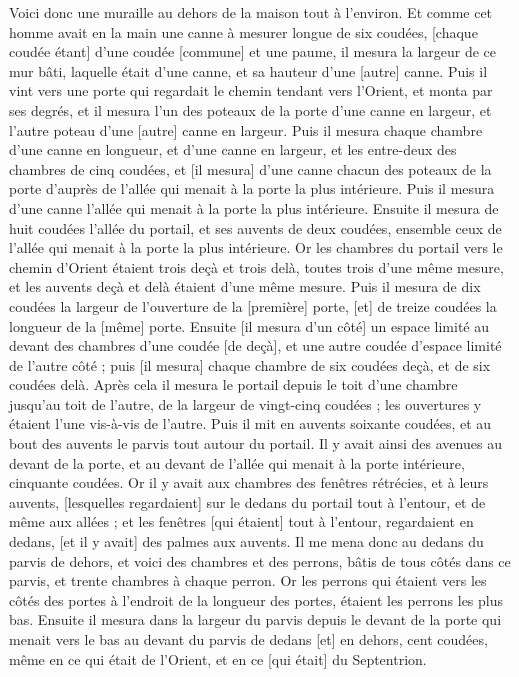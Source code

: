 \begin{multicols}{2}
Voici donc une muraille au dehors de la maison tout à l'environ. Et comme cet homme avait en la main une canne à mesurer longue de six coudées, [chaque coudée étant] d'une coudée [commune] et une paume, il mesura la largeur de ce mur bâti, laquelle était d'une canne, et sa hauteur d'une [autre] canne.
Puis il vint vers une porte qui regardait le chemin tendant vers l'Orient, et monta par ses degrés, et il mesura l'un des poteaux de la porte d'une canne en largeur, et l'autre poteau d'une [autre] canne en largeur.
Puis il mesura chaque chambre d'une canne en longueur, et d'une canne en largeur, et les entre-deux des chambres de cinq coudées, et [il mesura] d'une canne chacun des poteaux de la porte d'auprès de l'allée qui menait à la porte la plus intérieure.
Puis il mesura d'une canne l'allée qui menait à la porte la plus intérieure.
Ensuite il mesura de huit coudées l'allée du portail, et ses auvents de deux coudées, ensemble ceux de l'allée qui menait à la porte la plus intérieure.
Or les chambres du portail vers le chemin d'Orient étaient trois deçà et trois delà, toutes trois d'une même mesure, et les auvents deçà et delà étaient d'une même mesure.
Puis il mesura de dix coudées la largeur de l'ouverture de la [première] porte, [et] de treize coudées la longueur de la [même] porte.
Ensuite [il mesura d'un côté] un espace limité au devant des chambres d'une coudée [de deçà], et une autre coudée d'espace limité de l'autre côté ; puis [il mesura] chaque chambre de six coudées deçà, et de six coudées delà.
Après cela il mesura le portail depuis le toit d'une chambre jusqu'au toit de l'autre, de la largeur de vingt-cinq coudées ; les ouvertures y étaient l'une vis-à-vis de l'autre.
Puis il mit en auvents soixante coudées, et au bout des auvents le parvis tout autour du portail.
Il y avait ainsi des avenues au devant de la porte, et au devant de l'allée qui menait à la porte intérieure, cinquante coudées.
Or il y avait aux chambres des fenêtres rétrécies, et à leurs auvents, [lesquelles regardaient] sur le dedans du portail tout à l'entour, et de même aux allées ; et les fenêtres [qui étaient] tout à l'entour, regardaient en dedans, [et il y avait] des palmes aux auvents.
Il me mena donc au dedans du parvis de dehors, et voici des chambres et des perrons, bâtis de tous côtés dans ce parvis, et trente chambres à chaque perron.
Or les perrons qui étaient vers les côtés des portes à l'endroit de la longueur des portes, étaient les perrons les plus bas.
Ensuite il mesura dans la largeur du parvis depuis le devant de la porte qui menait vers le bas au devant du parvis de dedans [et] en dehors, cent coudées, même en ce qui était de l'Orient, et en ce [qui était] du Septentrion.

\end{multicols}
